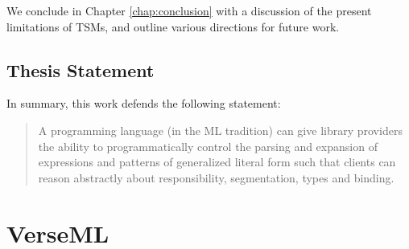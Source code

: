 
We conclude in Chapter \ref{chap:conclusion} with a discussion of the present limitations of TSMs, and outline various directions for future work.

\subsection{Thesis Statement}
In summary, this work defends the following statement:

\begin{quote}
A programming language (in the ML tradition) can give library providers the ability to %
programmatically control the parsing and expansion of expressions and patterns of generalized literal form such that clients can reason abstractly about responsibility, segmentation, types and binding. %
\end{quote}

\section{VerseML}

